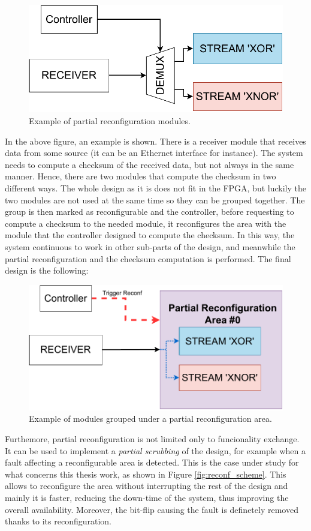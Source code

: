 \begin{figure}[H]
\centering
\includegraphics[width=0.8\linewidth]{images/chapter4/partial_modules.pdf}
\caption{Example of partial reconfiguration modules.}
\label{fig:partial_why}
\end{figure}

In the above figure, an example is shown. There is a receiver module that receives data from some source (it can be an Ethernet interface for instance). The system needs to compute a checksum of the received data, but not always in the same manner. Hence, there are two modules that compute the checksum in two different ways. The whole design as it is does not fit in the FPGA, but luckily the two modules are not used at the same time so they can be grouped together. The group is then marked as reconfigurable and the controller, before requesting to compute a checksum to the needed module, it reconfigures the area with the module that the controller designed to compute the checksum. In this way, the system continuous to work in other sub-parts of the design, and meanwhile the partial reconfiguration and the checksum computation is performed. The final design is the following:

\begin{figure}[H]
\centering
\includegraphics[width=0.8\linewidth]{images/chapter4/partial_modules_group.pdf}
\caption{Example of modules grouped under a partial reconfiguration area.}
\label{fig:partial_why_group}
\end{figure}

Furthemore, partial reconfiguration is not limited only to funcionality exchange. It can be used to implement a \textit{partial scrubbing} of the design, for example when a fault affecting a reconfigurable area is detected. This is the case under study for what concerns this thesis work, as shown in Figure \ref{fig:reconf_scheme}. This allows to reconfigure the area without interrupting the rest of the design and mainly it is faster, reducing the down-time of the system, thus improving the overall availability. Moreover, the bit-flip causing the fault is definetely removed thanks to its reconfiguration.\bigskip

